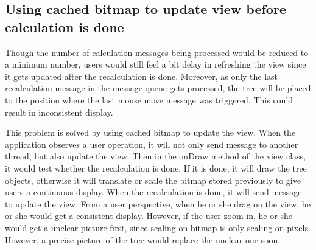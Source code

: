 \documentclass[MSc]{icldt}
\begin{document}
    

\subsection{Using cached bitmap to update view before calculation is done}
 
 Though the number of calculation messages being processed would be reduced to a minimum number, users would still feel a bit delay in refreshing the view since it gets updated after the recalculation is done. Moreover, as only the last recalculation message in the message queue gets processed, the tree will be placed to the position where the last mouse move message was triggered. This could result in inconsistent display. 

This problem is solved by using cached bitmap to update the view. When the application observes a user operation, it will not only send message to another thread, but also update the view. Then in the onDraw method of the view class, it would test whether the recalculation is done. If it is done, it will draw the tree objects, otherwise it will translate or scale the bitmap stored previously to give users a continuous display. When the recalculation is done, it will send message to update the view. From a user perspective, when he or she drag on the view, he or she would get a consistent display. However, if the user zoom in, he or she would get a unclear picture first, since scaling on bitmap is only scaling on pixels. However, a precise picture of the tree would replace the unclear one soon. 
\end{document}
